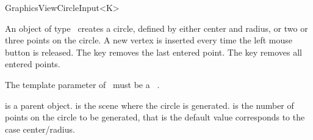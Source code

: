 \begin{ccRefClass}[Qt::]{GraphicsViewCircleInput<K>}

\ccDefinition
An object of type \ccRefName\ creates a circle, defined by either
center and radius, or two or three points on the circle. A new 
vertex is inserted every time the left mouse button is released.
The  key removes the last entered point. The  
key removes all entered points.



\ccParameters

The template parameter of \ccRefName\ must be a \cgal\ . 

\ccInheritsFrom
{}

\ccGlue

\ccCreation
{}

{ is a parent object.  is the scene where the circle is generated.  is the
  number of points on the circle to be generated, that is the default value 
  corresponds to the case center/radius.}



\end{ccRefClass}







